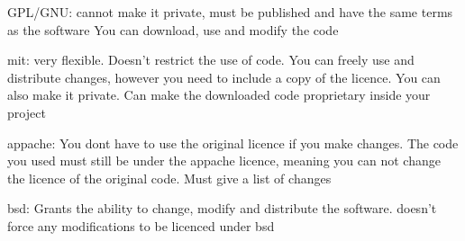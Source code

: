 GPL/GNU:
cannot make it private, must be published and have the same terms as the software
You can download, use and modify the code


mit:
very flexible. Doesn't restrict the use of code. You can freely use and distribute changes, however you need to include a copy of the licence. You can also make it private. Can make the downloaded code proprietary inside your project

appache:
You dont have to use the original licence if you make changes. The code you used must still be under the appache licence, meaning you can not change the licence of the original code. Must give a list of changes

bsd:
Grants the ability to change, modify and distribute the software. doesn't force any modifications to be licenced under bsd
